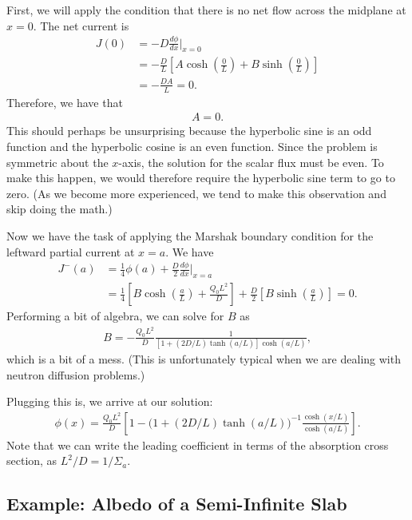 First, we will apply the condition that there is no net flow across the midplane at $x = 0$. The net current is
\begin{align}
  J(0) 	&= - D \frac{d\phi}{dx} \bigg|_{x = 0} \nonumber \\
  		&= - \frac{D}{L} \left[  A \cosh\left( \frac{0}{L} \right) + B \sinh\left( \frac{0}{L} \right) \right] \nonumber \\
		&= - \frac{DA}{L} = 0.
\end{align}
Therefore, we have that
\begin{align}
  A = 0.
\end{align}
This should perhaps be unsurprising because the hyperbolic sine is an odd function and the hyperbolic cosine is an even function. Since the problem is symmetric about the $x$-axis, the solution for the scalar flux must be even. To make this happen, we would therefore require the hyperbolic sine term to go to zero. (As we become more experienced, we tend to make this observation and skip doing the math.)

Now we have the task of applying the Marshak boundary condition for the leftward partial current at $x = a$. We have
\begin{align}
  J^-(a) 	&= \frac{1}{4} \phi(a) + \frac{D}{2} \frac{d\phi}{dx} \bigg|_{x = a} \nonumber \\
  			&= \frac{1}{4} \left[ B \cosh\left( \frac{a}{L} \right) + \frac{ Q_0 L^2 }{ D } \right] + \frac{D}{2} \left[ B \sinh\left( \frac{a}{L} \right) \right] = 0.
\end{align}
Performing a bit of algebra, we can solve for $B$ as
\begin{align}
  B = -\frac{ Q_0 L^2 }{ D } \frac{ 1 }{ [ 1 + (2 D / L ) \tanh( a / L ) ] \cosh(a / L ) } ,
\end{align}
which is a bit of a mess. (This is unfortunately typical when we are dealing with neutron diffusion problems.)

Plugging this is, we arrive at our solution:
\begin{align}
  \phi(x) = \frac{ Q_0 L^2 }{ D } \left[ 1 - \big( 1 + (2 D / L ) \tanh( a / L ) \big)^{-1} \frac{ \cosh(x/L) }{ \cosh(a/L) } \right] .
\end{align}
Note that we can write the leading coefficient in terms of the absorption cross section, as $L^2/D = 1/\Sigma_a$.

\subsection{Example: Albedo of a Semi-Infinite Slab}

